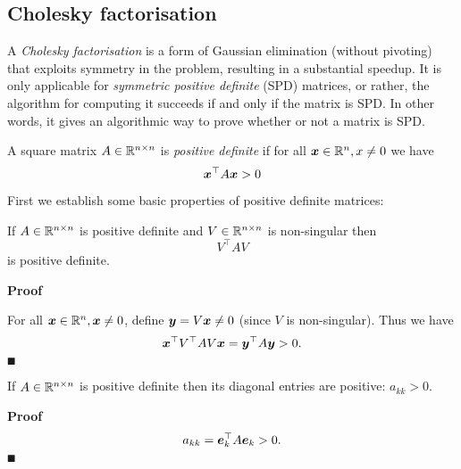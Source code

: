 \subsection{Cholesky factorisation}
A \emph{Cholesky factorisation} is a form of Gaussian elimination (without pivoting) that exploits symmetry in the problem, resulting in a substantial speedup. It is only applicable for \emph{symmetric positive definite} (SPD) matrices, or rather, the algorithm for computing it succeeds if and only if the matrix is SPD. In other words, it gives an algorithmic way to prove whether or not a matrix is SPD.

\begin{definition} A square matrix $A \in {\mathbb R}^{n \times n}$ is \emph{positive definite} if for all $\bm{{\mbox{\boldmath$x$\unboldmath}}} \in {\mathbb R}^n, x \neq 0$ we have
\[
\bm{{\mbox{\boldmath$x$\unboldmath}}}^\top A \bm{{\mbox{\boldmath$x$\unboldmath}}} > 0
\]
\end{definition}

First we establish some basic properties of positive definite matrices:

\begin{proposition} If  $A \in {\mathbb R}^{n \times n}$ is positive definite and $V \in {\mathbb R}^{n \times n}$ is non-singular then
\[
V^\ensuremath{\top} A V
\]
is positive definite. \end{proposition}
\textbf{Proof}

For all  $\bm{{\mbox{\boldmath$x$\unboldmath}}} \in {\mathbb R}^n, \bm{{\mbox{\boldmath$x$\unboldmath}}} \neq 0$, define $\bm{{\mbox{\boldmath$y$\unboldmath}}} = V \bm{{\mbox{\boldmath$x$\unboldmath}}} \neq 0$ (since $V$ is non-singular). Thus we have
\[
\bm{{\mbox{\boldmath$x$\unboldmath}}}^\top V^\top A V \bm{{\mbox{\boldmath$x$\unboldmath}}} = \bm{{\mbox{\boldmath$y$\unboldmath}}}^\top A \bm{{\mbox{\boldmath$y$\unboldmath}}} > 0.
\]
\ensuremath{\QED}

\begin{proposition} If $A \in {\mathbb R}^{n \times n}$ is positive definite then its diagonal entries are positive: $a_{kk} > 0$. \end{proposition}
\textbf{Proof}
\[
a_{kk} = \bm{{\mbox{\boldmath$e$\unboldmath}}}_k^\top A \bm{{\mbox{\boldmath$e$\unboldmath}}}_k > 0.
\]
\ensuremath{\QED}

